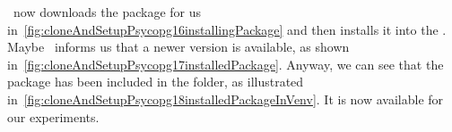 \pycharm\ now downloads the package for us in~\cref{fig:cloneAndSetupPsycopg16installingPackage} and then installs it into the .
Maybe \pycharm\ informs us that a newer version is available, as shown in~\cref{fig:cloneAndSetupPsycopg17installedPackage}.
Anyway, we can see that the package has been included in the  folder, as illustrated in~\cref{fig:cloneAndSetupPsycopg18installedPackageInVenv}.
It is now available for our experiments.%
%
\FloatBarrier%
\endhsection%
%
\endhsection%
%
